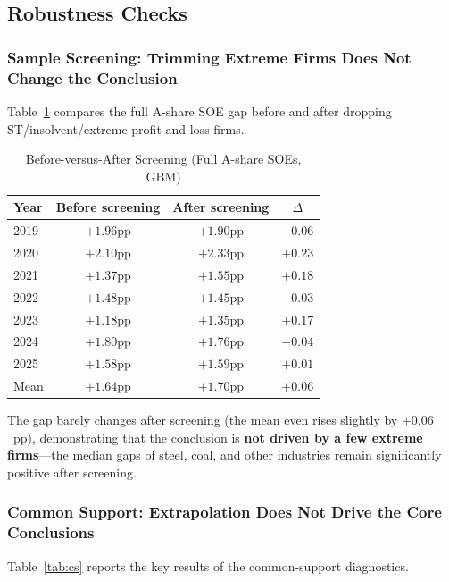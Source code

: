 \documentclass[11pt,a4paper]{article}
\begin{document}
\subsection{Robustness Checks}

\subsubsection{Sample Screening: Trimming Extreme Firms Does Not Change the Conclusion}

Table~\ref{tab:screening} compares the full A-share SOE gap before and after dropping ST/insolvent/extreme profit-and-loss firms.

\begin{table}[htbp]
\centering
\caption{Before-versus-After Screening (Full A-share SOEs, GBM)}
\label{tab:screening}
\begin{threeparttable}
\small
\begin{tabular}{lccc}
\toprule
Year & Before screening & After screening & $\Delta$ \\
\midrule
2019 & $+1.96$pp & $+1.90$pp & $-0.06$ \\
2020 & $+2.10$pp & $+2.33$pp & $+0.23$ \\
2021 & $+1.37$pp & $+1.55$pp & $+0.18$ \\
2022 & $+1.48$pp & $+1.45$pp & $-0.03$ \\
2023 & $+1.18$pp & $+1.35$pp & $+0.17$ \\
2024 & $+1.80$pp & $+1.76$pp & $-0.04$ \\
2025 & $+1.58$pp & $+1.59$pp & $+0.01$ \\
\midrule
Mean & $+1.64$pp & $+1.70$pp & $+0.06$ \\
\bottomrule
\end{tabular}
\end{threeparttable}
\end{table}

The gap barely changes after screening (the mean even rises slightly by $+0.06$~pp), demonstrating that the conclusion is \textbf{not driven by a few extreme firms}---the median gaps of steel, coal, and other industries remain significantly positive after screening.

\subsubsection{Common Support: Extrapolation Does Not Drive the Core Conclusions}

Table~\ref{tab:cs} reports the key results of the common-support diagnostics.
\end{document}
